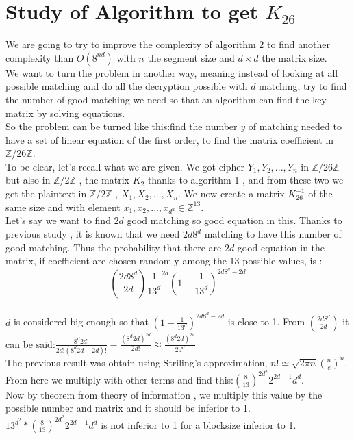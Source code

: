 \documentclass{article}
\begin{document}
\section{Study of Algorithm to get $K_{26}$}
We are going to try to improve the complexity of algorithm 2 to find another complexity than $O(8^{nd})$ with $n$ the segment size and $d \times d$ the matrix size.\\
We want to turn the problem in another way, meaning instead of looking at all possible matching and do all the decryption possible with $d$ matching, try to find  the number of good matching we need so that an algorithm can find the key matrix by solving equations.\\
So the problem can be turned like this:find the number $y$ of matching needed to have a set of linear equation of the first order, to find the matrix coefficient in $\mathbb{Z}/26\mathbb{Z}$.\\
To be clear, let's recall what we are given. We got cipher $Y_1 , Y_2 , ... , Y_n$ in $\mathbb{Z}/26\mathbb{Z}$ but also in $\mathbb{Z}/2\mathbb{Z}$ , the matrix $K_2$ thanks to algorithm 1 , and from these two we get the plaintext in $\mathbb{Z}/2\mathbb{Z}$ , $X_1,X_2,...,X_n$. We now create a matrix $K_{26}^{-1}$ of the same size and with element $x_1 , x_2 , ... , x_{d^2} \in \mathbb{Z}^{13}$.\\
Let's say we want to find $2d$ good matching so good equation in this. Thanks to previous study , it is known that we need $2d8^d$ matching to have this number of good matching. Thus the probability that there are $2d$ good equation in the matrix, if coefficient are chosen randomly among the 13 possible values, is : $$ {2d8^d \choose 2d} \frac{1}{13^d}^{2d} (1-\frac{1}{13^d})^{2d8^d - 2d}$$\\
$d$ is considered big enough so that $(1-\frac{1}{13^d})^{2d8^d - 2d}$ is close to 1.
From ${2d8^d \choose 2d}$ it can be said:$\frac{8^d 2d!}{2d!(8^d 2d-2d)!} = \frac{(8^d 2d)^{2d}}{2d!} \approx \frac{(8^d 2d)^{2d}}{2d^{d}}$\\
The previous result was obtain using Striling's approximation, $n! \simeq \sqrt{2\pi n}(\frac{n}{e})^n$.\\
From here we multiply with other terms and find this:$(\frac{8}{13})^{2d^2} 2^{2d-1} d^d$.\\
Now by theorem from theory of information , we multiply this value by the possible number and matrix and it should be inferior to 1.\\
$13^{d^2} * (\frac{8}{13})^{2d^2} 2^{2d-1} d^d$ is not inferior to 1 for a blocksize inferior to 1.
\end{document}
